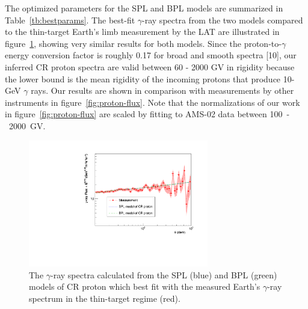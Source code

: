 The optimized parameters  for the SPL and BPL models are summarized in Table~\ref{tb:bestparams}. 
The best-fit $\gamma$-ray spectra from the two models
compared to the thin-target Earth's limb measurement by the LAT are illustrated
in figure~\ref{fig:gamma-flux}, showing very similar results for both models.
Since the proton-to-$\gamma$ energy conversion factor is roughly 0.17 for broad
and smooth spectra [10], our inferred CR proton spectra are valid between 60 - 2000 GV
in rigidity
because the lower bound is the mean rigidity of the incoming protons that produce 10-GeV $\gamma$ rays.
Our results are shown in comparison with measurements by other instruments in figure~\ref{fig:proton-flux}.
Note that the normalizations of our work in figure~\ref{fig:proton-flux} are scaled
by fitting to AMS-02 data between 100~-~2000~GV.


\begin{figure}[h!]
    \centering
    \includegraphics[width=0.7\textwidth]{img/fitted_result}
    \caption{
        The $\gamma$-ray spectra calculated from the SPL (blue)
        and BPL (green) models of CR proton which best fit with the measured Earth's
        $\gamma$-ray spectrum in the thin-target regime (red).
    }
    \label{fig:gamma-flux}
\end{figure}



